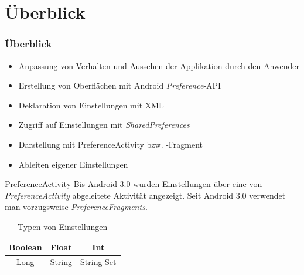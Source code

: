 \section{Überblick}
\begin{frame}
   \frametitle{Überblick}
   \begin{itemize}
      \item Anpassung von Verhalten und Aussehen der Applikation durch den 
         Anwender
      \item Erstellung von Oberflächen mit Android \emph{Preference}-API 
      \item Deklaration von Einstellungen mit XML
      \item Zugriff auf Einstellungen mit \emph{SharedPreferences}
      \item Darstellung mit PreferenceActivity bzw. -Fragment
      \item Ableiten eigener Einstellungen
   \end{itemize}

   \begin{alertblock}{PreferenceActivity}
      Bis Android 3.0 wurden Einstellungen über eine von \emph{PreferenceActivity} 
      abgeleitete Aktivität angezeigt. Seit Android 3.0 verwendet man 
      vorzugsweise \emph{PreferenceFragments}.
   \end{alertblock}

   \begin{table}[t]
      \begin{center}
         \begin{tabular}{c|c|c}
            Boolean & Float & Int\\
            \hline
            Long & String & String Set\\
         \end{tabular}
         \label{tab:preference_types}
         \caption{Typen von Einstellungen}
      \end{center}
   \end{table}
\end{frame}

